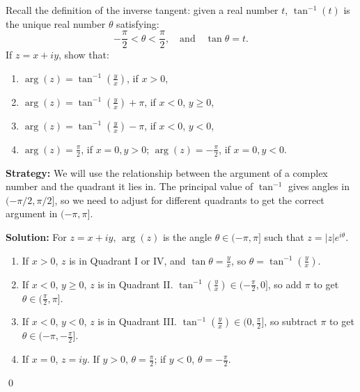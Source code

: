 \begin{problembox}
\begin{problemstatement}
Recall the definition of the inverse tangent: given a real number \( t \), \( \tan^{-1}(t) \) is the unique real number \( \theta \) satisfying:
\[
-\frac{\pi}{2} < \theta < \frac{\pi}{2}, \quad \text{and} \quad \tan \theta = t.
\]
If \( z = x + iy \), show that:
\begin{enumerate}[label=\alph*)]
\item \( \arg(z) = \tan^{-1}\left( \frac{y}{x} \right) \), if \( x > 0 \),
\item \( \arg(z) = \tan^{-1}\left( \frac{y}{x} \right) + \pi \), if \( x < 0 \), \( y \geq 0 \),
\item \( \arg(z) = \tan^{-1}\left( \frac{y}{x} \right) - \pi \), if \( x < 0 \), \( y < 0 \),
\item \( \arg(z) = \frac{\pi}{2} \), if \( x = 0, y > 0 \); \quad \( \arg(z) = -\frac{\pi}{2} \), if \( x = 0, y < 0 \).
\end{enumerate}
\end{problemstatement}
\end{problembox}

\noindent\textbf{Strategy:} We will use the relationship between the argument of a complex number and the quadrant it lies in. The principal value of $\tan^{-1}$ gives angles in $(-\pi/2, \pi/2]$, so we need to adjust for different quadrants to get the correct argument in $(-\pi, \pi]$.

\bigskip\noindent\textbf{Solution:}
For \( z = x + iy \), \( \arg(z) \) is the angle \( \theta \in (-\pi, \pi] \) such that \( z = |z| e^{i\theta} \).
\begin{enumerate}[label=\alph*)]
\item If \( x > 0 \), \( z \) is in Quadrant I or IV, and \( \tan \theta = \frac{y}{x} \), so \( \theta = \tan^{-1}\left( \frac{y}{x} \right) \).
\item If \( x < 0 \), \( y \geq 0 \), \( z \) is in Quadrant II. \( \tan^{-1}\left( \frac{y}{x} \right) \in (-\frac{\pi}{2}, 0] \), so add \( \pi \) to get \( \theta \in (\frac{\pi}{2}, \pi] \).
\item If \( x < 0 \), \( y < 0 \), \( z \) is in Quadrant III. \( \tan^{-1}\left( \frac{y}{x} \right) \in (0, \frac{\pi}{2}] \), so subtract \( \pi \) to get \( \theta \in (-\pi, -\frac{\pi}{2}] \).
\item If \( x = 0 \), \( z = iy \). If \( y > 0 \), \( \theta = \frac{\pi}{2} \); if \( y < 0 \), \( \theta = -\frac{\pi}{2} \).
\end{enumerate}\qed


